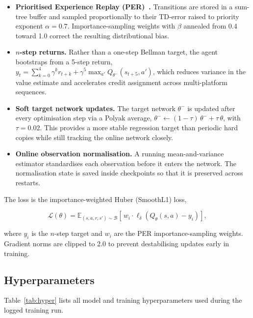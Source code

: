 \documentclass[11pt]{article}
\begin{document}
\begin{itemize}
  \item \textbf{Prioritised Experience Replay (PER)~\cite{schaul2016}.}
    Transitions are stored in a sum-tree buffer and sampled
    proportionally to their TD-error raised to priority exponent
    $\alpha = 0.7$. Importance-sampling weights with $\beta$ annealed
    from 0.4 toward 1.0 correct the resulting distributional bias.

  \item \textbf{$n$-step returns.} Rather than a one-step Bellman
    target, the agent bootstraps from a 5-step return,
    $y_t = \sum_{k=0}^{4} \gamma^k r_{t+k} + \gamma^5
    \max_{a'} Q_{\theta^-}(s_{t+5}, a')$, which reduces variance in
    the value estimate and accelerates credit assignment across
    multi-platform sequences.

  \item \textbf{Soft target network updates.} The target network
    $\theta^-$ is updated after every optimisation step via a Polyak
    average, $\theta^- \leftarrow (1-\tau)\,\theta^- + \tau\,\theta$,
    with $\tau = 0.02$. This provides a more stable regression target
    than periodic hard copies while still tracking the online network
    closely.

  \item \textbf{Online observation normalisation.} A running
    mean-and-variance estimator standardises each observation before it
    enters the network. The normalisation state is saved inside
    checkpoints so that it is preserved across restarts.
\end{itemize}

The loss is the importance-weighted Huber (SmoothL1) loss,

\begin{equation}
  \mathcal{L}(\theta) =
  \mathbb{E}_{(s,a,r,s') \sim \mathcal{B}}
  \!\left[\,w_i \cdot \ell_\delta\!\left(Q_\theta(s,a) - y_i\right)\right],
  \label{eq:loss}
\end{equation}

where $y_i$ is the $n$-step target and $w_i$ are the PER
importance-sampling weights. Gradient norms are clipped to 2.0 to
prevent destabilising updates early in training.

\subsection{Hyperparameters}

Table~\ref{tab:hyper} lists all model and training hyperparameters used
during the logged training run.
\end{document}
